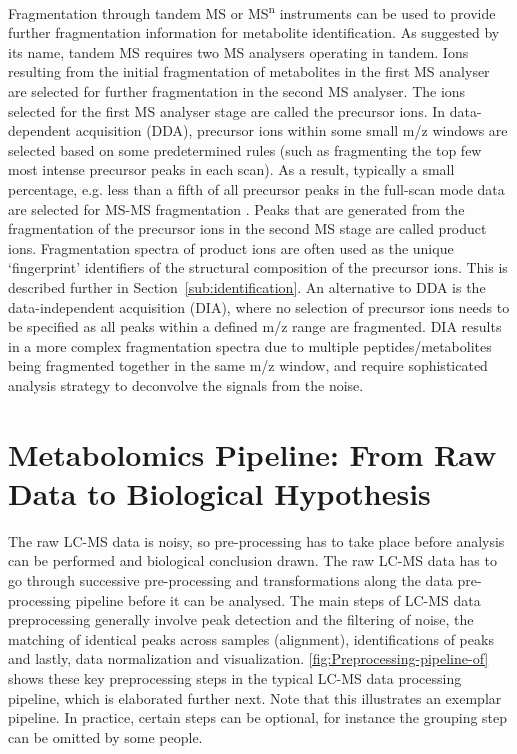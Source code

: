 Fragmentation through tandem MS or MS\textsuperscript{n} instruments can be used to provide further fragmentation information for metabolite identification. As suggested by its name, tandem MS requires two MS analysers operating in tandem. Ions resulting from the initial fragmentation of metabolites in the first MS analyser are selected for further fragmentation in the second MS analyser. The ions selected for the first MS analyser stage are called the precursor ions. In data-dependent acquisition (DDA), precursor ions within some small m/z windows are selected based on some predetermined rules (such as fragmenting the top few most intense precursor peaks in each scan). As a result, typically a small percentage, e.g. less than a fifth of all precursor peaks in the full-scan mode data are selected for MS-MS fragmentation \cite{Smith2004}. Peaks that are generated from the fragmentation of the precursor ions in the second MS stage are called product ions. Fragmentation spectra of product ions are often used as the unique `fingerprint' identifiers of the structural composition of the precursor ions. This is described further in Section~\ref{sub:identification}. An alternative to DDA is the data-independent acquisition (DIA), where no selection of precursor ions needs to be specified as all peaks within a defined m/z range are fragmented. DIA results in a more complex fragmentation spectra due to multiple peptides/metabolites being fragmented together in the same m/z window, and require sophisticated analysis strategy to deconvolve the signals from the noise. 

\section{Metabolomics Pipeline: From Raw Data to Biological Hypothesis}

The raw LC-MS data is noisy, so pre-processing has to take place before analysis can be performed and biological conclusion drawn. The raw LC-MS data has to go through successive pre-processing and transformations along the data pre-processing pipeline before it can be analysed. The main steps of LC-MS data preprocessing generally involve peak detection and the filtering of noise, the matching of identical peaks across samples (alignment), identifications of peaks and lastly, data normalization and visualization. \ref{fig:Preprocessing-pipeline-of} shows these key preprocessing steps in the typical LC-MS data processing pipeline, which is elaborated further next. Note that this illustrates an exemplar pipeline. In practice, certain steps can be optional, for instance the grouping step can be omitted by some people. 

